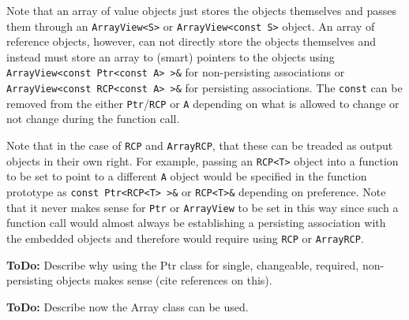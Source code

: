 Note that an array of value objects just stores the objects themselves and
passes them through an {}\texttt{ArrayView<S>} or {}\texttt{ArrayView<const
S>} object.  An array of reference objects, however, can not directly store
the objects themselves and instead must store an array to (smart) pointers to
the objects using {}\texttt{ArrayView<const Ptr<const A> >\&} for
non-persisting associations or {}\texttt{ArrayView<const RCP<const A> >\&} for
persisting associations.  The {}\texttt{const} can be removed from the either
{}\texttt{Ptr}/{}\texttt{RCP} or {}\texttt{A} depending on what is allowed to
change or not change during the function call.

Note that in the case of {}\texttt{RCP} and {}\texttt{ArrayRCP}, that these
can be treaded as output objects in their own right.  For example, passing an
{}\texttt{RCP<T>} object into a function to be set to point to a different
{}\texttt{A} object would be specified in the function prototype as
{}\texttt{const Ptr<RCP<T> >\&} or {}\texttt{RCP<T>\&} depending on
preference.  Note that it never makes sense for {}\texttt{Ptr} or
{}\texttt{ArrayView} to be set in this way since such a function call would
almost always be establishing a persisting association with the embedded
objects and therefore would require using {}\texttt{RCP} or
{}\texttt{ArrayRCP}.

{}\textbf{ToDo:} Describe why using the Ptr class for single, changeable,
required, non-persisting objects makes sense (cite references on this).

{}\textbf{ToDo:} Describe now the Array class can be used.



